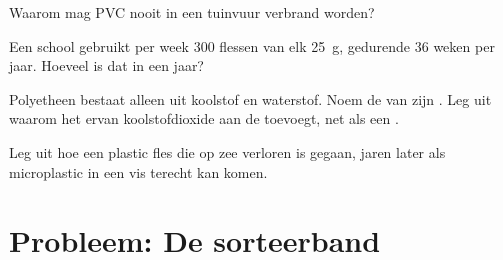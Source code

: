 \begin{exercise}[$\star\star$]\label{exo:g8:plastics:9}
Waarom mag PVC nooit in een tuinvuur verbrand worden?
\end{exercise}

\begin{exercise}[$\star\star$]\label{exo:g8:plastics:10}
Een school gebruikt per week 300 flessen van elk \qty{25}{g}, gedurende
36 weken per jaar. Hoeveel  is dat in een jaar?
\end{exercise}

\begin{exercise}[$\star\star\star$]\label{exo:g8:plastics:11}
Polyetheen bestaat alleen uit koolstof en waterstof. Noem de
 van zijn . Leg uit waarom het
 ervan koolstofdioxide aan de  toevoegt, net als een
.
\end{exercise}

\begin{exercise}[$\star\star\star$]\label{exo:g8:plastics:12}
Leg uit hoe een plastic fles die op zee verloren is gegaan, jaren later
als microplastic in een vis terecht kan komen.
\end{exercise}

\section{Probleem: De sorteerband}

